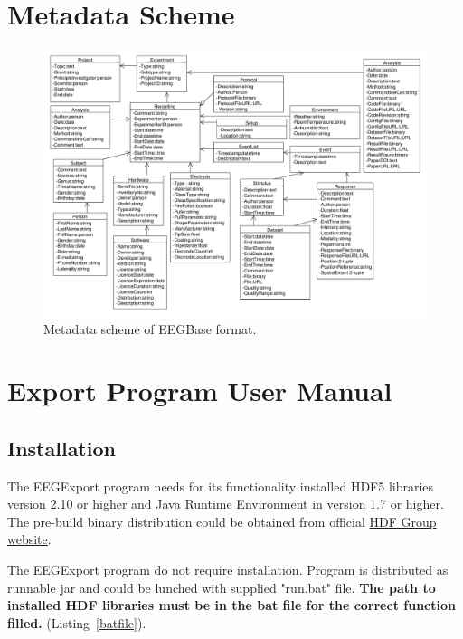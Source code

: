 \documentclass{diplomka}
\begin{document}
\chapter{Metadata Scheme}
\label{appendix2}
\begin{figure}[h]
	\begin{center}
		\includegraphics[scale=0.40]{obrazky/meta-scheme.pdf}
		\caption{Metadata scheme of EEGBase format.}
		\label{meta_scheme}
	\end{center}
\end{figure}

\chapter{Export Program User Manual}

\section{Installation}



The EEGExport program needs for its functionality installed HDF5 libraries version 2.10 or higher and Java Runtime Environment in version 1.7 or higher. The pre-build binary distribution could be obtained from official \href{https://www.hdfgroup.org/products/java/release/download.html\#download}{HDF Group website}. 

The EEGExport program do not require installation. Program is distributed as runnable jar and could be lunched with supplied "run.bat" file. \textbf{The path to installed HDF libraries must be in the bat file for the correct function filled.} (Listing~\ref{batfile}).
\end{document}
